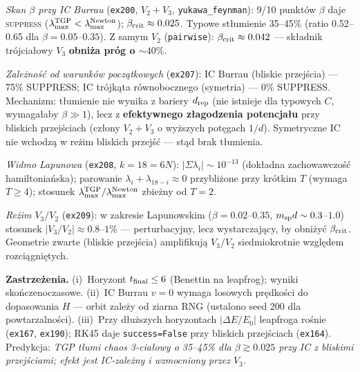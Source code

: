 \emph{Skan $\beta$ przy IC Burrau} (\texttt{ex200}, $V_2{+}V_3$,
\texttt{yukawa\_feynman}): 9/10 punktów $\beta$ daje \textsc{suppress}
($\lambda_{\max}^{\rm TGP}<\lambda_{\max}^{\rm Newton}$); $\beta_{\rm crit}\approx 0.025$.
Typowe stłumienie 35--45\% (ratio 0.52--0.65 dla $\beta=0.05$--$0.35$).
Z samym $V_2$ (\texttt{pairwise}): $\beta_{\rm crit}\approx 0.042$ ---
składnik trójciałowy $V_3$ \textbf{obniża próg o $\sim 40\%$}.

\emph{Zależność od warunków początkowych} (\texttt{ex207}):
IC Burrau (bliskie przejścia) --- 75\% SUPPRESS;
IC trójkąta równobocznego (symetria) --- 0\% SUPPRESS.
Mechanizm: tłumienie nie wynika z bariery $d_{\rm rep}$ (nie istnieje
dla typowych $C$, wymagałaby $\beta\gg1$), lecz z \textbf{efektywnego
złagodzenia potencjału} przy bliskich przejściach (człony $V_2{+}V_3$
o wyższych potęgach $1/d$). Symetryczne IC nie wchodzą w reżim
bliskich przejść --- stąd brak tłumienia.

\emph{Widmo Lapunowa} (\texttt{ex208}, $k{=}18{=}6N$):
$|\Sigma\lambda_i|\sim 10^{-13}$ (dokładna zachowawczość hamiltoniańska);
parowanie $\lambda_i+\lambda_{18-i}\approx 0$ przybliżone przy krótkim $T$
(wymaga $T\geq 4$); stosunek $\lambda_{\max}^{\rm TGP}/\lambda_{\max}^{\rm Newton}$
zbieżny od $T=2$.

\emph{Reżim $V_3/V_2$} (\texttt{ex209}):
w zakresie Lapunowskim ($\beta=0.02$--$0.35$, $m_{\rm sp}d\sim 0.3$--$1.0$)
stosunek $|V_3/V_2|\approx 0.8$--$1\%$ --- perturbacyjny, lecz wystarczający,
by obniżyć $\beta_{\rm crit}$. Geometrie zwarte (bliskie przejścia)
amplifikują $V_3/V_2$ siedmiokrotnie względem rozciągniętych.

\medskip\noindent\textbf{Zastrzeżenia.}
(i)~Horyzont $t_{\rm final}\leq 6$ (Benettin na leapfrog); wyniki skończenoczasowe.
(ii)~IC Burrau $v{=}0$ wymaga losowych prędkości do dopasowania $H$ --- orbit zależy
od ziarna RNG (ustalono seed 200 dla powtarzalności).
(iii)~Przy dłuższych horyzontach $|{\Delta E}/{E_0}|$ leapfroga rośnie
(\texttt{ex167}, \texttt{ex190}); RK45 daje \texttt{success=False} przy
bliskich przejściach (\texttt{ex164}).
Predykcja: \emph{TGP tłumi chaos 3-ciałowy o 35--45\% dla $\beta\gtrsim 0.025$
przy IC z bliskimi przejściami; efekt jest IC-zależny i wzmocniony przez $V_3$.}

